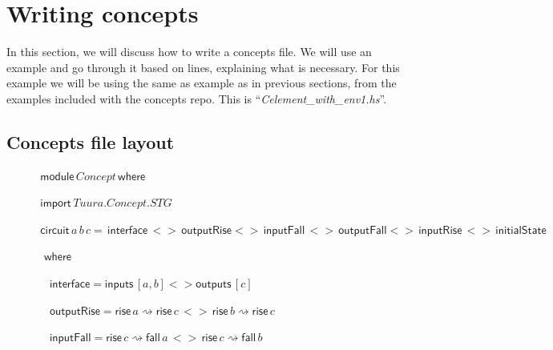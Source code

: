 \documentclass{proc}
\begin{document}
\section{Writing concepts \label{sec:concepts_layout}}

In this section, we will discuss how to write a concepts file. 
We will use an example and go through it based on lines, explaining what is necessary. For this example we will be using the same 
as example as in previous sections, from the examples included with the concepts repo. This is ``\emph{Celement\_with\_env1.hs}''.

\subsection{Concepts file layout}

\begin{figure}[H]
\begin{centering}

\begin{flushleft}
$\,\mathsf{module}\, Concept \, \mathsf{where}$
\par\end{flushleft}

\begin{flushleft}
$\,\mathsf{import}\, Tuura.Concept.STG$
\par\end{flushleft}

\begin{flushleft}
$\,\mathsf{circuit}\,a \,b \,c=\mathsf{\,interface}\,<> \mathsf{\, outputRise}<>\,\mathsf{inputFall}\,<>\,\mathsf{outputFall}<>\mathsf{\, inputRise}\,<>\,\mathsf{initialState}$

$\,\,\,\mathsf{where}$
\par\end{flushleft}

\begin{flushleft}
$\,\,\,\,\,\,\mathsf{interface}=\mathsf{inputs}\,[a,b]<>\mathsf{outputs}\,[c]$
\par\end{flushleft}

\begin{flushleft}
$\,\,\,\,\,\,\mathsf{outputRise}=\mathsf{rise} \,a\rightsquigarrow \mathsf{rise} \,c\,<>\, \mathsf{rise} \,b\rightsquigarrow \mathsf{rise} \,c$
\par\end{flushleft}

\begin{flushleft}
$\,\,\,\,\,\,\mathsf{inputFall}=\mathsf{rise} \,c\rightsquigarrow \mathsf{fall} \,a \,<>\, \mathsf{rise} \,c \rightsquigarrow \mathsf{fall} \,b$
\par\end{flushleft}


\end{centering}
\end{figure}
\end{document}

